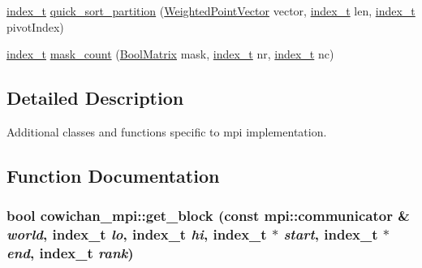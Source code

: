 \begin{CompactItemize}
\item 
\hyperlink{cowichan_8hpp_5b04577d5d21124855deaad298595371}{index\_\-t} \hyperlink{namespacecowichan__mpi_83904b95f448398ff15331182ee0c007}{quick\_\-sort\_\-partition} (\hyperlink{class_weighted_point}{WeightedPointVector} vector, \hyperlink{cowichan_8hpp_5b04577d5d21124855deaad298595371}{index\_\-t} len, \hyperlink{cowichan_8hpp_5b04577d5d21124855deaad298595371}{index\_\-t} pivotIndex)
\item 
\hyperlink{cowichan_8hpp_5b04577d5d21124855deaad298595371}{index\_\-t} \hyperlink{namespacecowichan__mpi_a54004a105356573d4bac92e1b234aa2}{mask\_\-count} (\hyperlink{cowichan_8hpp_a64c8df2f1e9c8ea68a7bcc19aca683e}{BoolMatrix} mask, \hyperlink{cowichan_8hpp_5b04577d5d21124855deaad298595371}{index\_\-t} nr, \hyperlink{cowichan_8hpp_5b04577d5d21124855deaad298595371}{index\_\-t} nc)
\end{CompactItemize}


\subsection{Detailed Description}
Additional classes and functions specific to mpi implementation. 



\subsection{Function Documentation}
\hypertarget{namespacecowichan__mpi_413bf41c8bf73b560d1c16a8e5206e5f}{
\subsubsection[{get\_\-block}]{\setlength{\rightskip}{0pt plus 5cm}bool cowichan\_\-mpi::get\_\-block (const mpi::communicator \& {\em world}, \/  {\bf index\_\-t} {\em lo}, \/  {\bf index\_\-t} {\em hi}, \/  {\bf index\_\-t} $\ast$ {\em start}, \/  {\bf index\_\-t} $\ast$ {\em end}, \/  {\bf index\_\-t} {\em rank})}}
\label{namespacecowichan__mpi_413bf41c8bf73b560d1c16a8e5206e5f}


